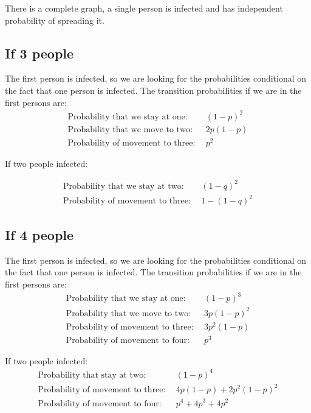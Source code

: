 \documentclass[12pt]{report}
\numberwithin{equation}{section}
\begin{document}
There is a complete graph, a single person is infected and has independent probability of spreading it. 

\subsection{If 3 people}

The first person is infected, so we are looking for the probabilities conditional on the fact that one person is infected. The transition probabilities if we are in the first persons are:
\begin{align}
\text{Probability that we stay at one:}& ~~(1-p)^2 \\
\text{Probability that we move to two:}&~~ 2p(1-p) \\
\text{Probability of movement to three:}& ~~p^2
\end{align}

If two people infected:

\begin{align} 
\text{Probability that we stay at two:}& ~~(1-q)^2 \\
\text{Probability of movement to three:}& ~~1-(1-q)^2
\end{align}

\subsection{If 4 people}

The first person is infected, so we are looking for the probabilities conditional on the fact that one person is infected. The transition probabilities if we are in the first persons are:
\begin{align}
\text{Probability that we stay at one:}& ~~(1-p)^3 \\
\text{Probability that we move to two:}& ~~3p(1-p)^2 \\
\text{Probability of movement to three:}& ~~3p^2(1-p) \\
\text{Probability of movement to four:}& ~~p^3
\end{align}

If two people infected:
\begin{align}
\text{Probability that stay at two:}&~~ (1-p)^4 \\
\text{Probability of movement to three:}& ~~4p(1-p)+2p^2(1-p)^2 \\
\text{Probability of movement to four:}& ~~p^4 + 4p^3+4p^2
\end{align}
\end{document}
